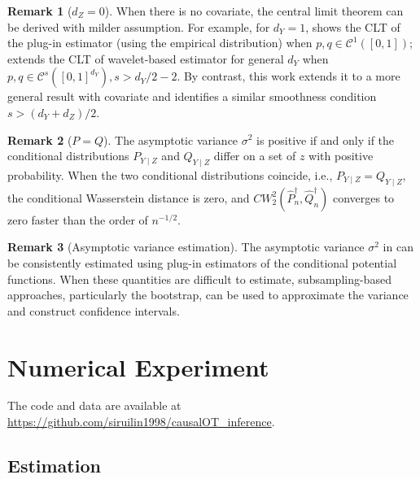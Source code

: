 \documentclass{article}
\theoremstyle{plain}
\theoremstyle{definition}
\newtheorem{remark}{Remark}[section]
\def\PP{P}
\def\QQ{Q}
\def\calC{\mathcal{C}}
\theoremstyle{plain}
\def\calC{\mathcal{C}}
\newcommand{\Cwass}{{CW}}
\begin{document}
\begin{remark}[$d_Z = 0$]
    When there is no covariate, the central limit theorem can be derived with milder assumption. For example, for $d_Y = 1$, \cite{del2005asymptotics} shows the CLT of the plug-in estimator (using the empirical distribution) when $p,q \in \calC^1([0,1])$; \cite{manole2024plugin} extends the CLT of wavelet-based estimator for general $d_Y$ when $p, q \in \calC^s([0,1]^{d_Y}), s > d_Y/2 - 2$. By contrast, this work extends it to a more general result with covariate and identifies a similar smoothness condition $s > (d_Y + d_Z)/2$. 
\end{remark}


\begin{remark}[$\PP = \QQ$]
    The asymptotic variance $\sigma^2$ is positive if and only if the conditional distributions $P_{Y\mid Z}$ and $Q_{Y\mid Z}$ differ on a set of $z$ with positive probability.
When the two conditional distributions coincide, i.e., $P_{Y\mid Z}=Q_{Y\mid Z}$, the conditional Wasserstein distance is zero, and  
$\Cwass_2^2(\widehat P_n^\dagger,\widehat Q_n^\dagger)$ converges to zero faster than the order of $n^{-1/2}$. 
\end{remark}



\begin{remark}[Asymptotic variance estimation]
The asymptotic variance $\sigma^2$ in  can be consistently estimated using plug-in estimators of the conditional potential functions. 
When these quantities are difficult to estimate, subsampling-based approaches, particularly the bootstrap, can be used to approximate the variance and construct confidence intervals.
\end{remark}


\section{Numerical Experiment}\label{sec:empirical}
The code and data are available at
\url{https://github.com/siruilin1998/causalOT_inference}.
\subsection{Estimation}\label{sec:empirical.estimation}
\end{document}
